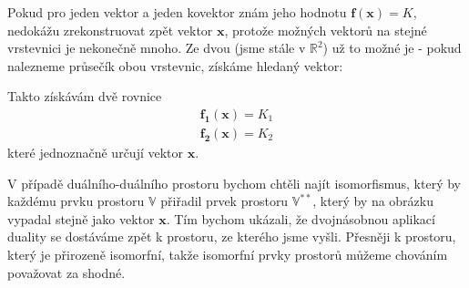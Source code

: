 \documentclass[a5paper,12pt]{amsbook}
\theoremstyle{definition}
\newcommand{\myvec}[1]{\bm{#1}}
\newcommand{\myspace}[1]{\mathbb{#1}}
\newcommand{\mydouble}[1]{\myspace{#1^{**}}}
\begin{document}
Pokud pro jeden vektor a jeden kovektor znám jeho hodnotu $\myvec{f(\myvec{x})} = K$, nedokážu zrekonstruovat
zpět vektor $\myvec{x}$, protože možných vektorů na stejné vrstevnici je nekonečně mnoho. Ze dvou (jsme stále
v $\mathbb{R}^2$) už to možné je - pokud nalezneme průsečík obou vrstevnic, získáme hledaný vektor:

\begin{center}

\end{center}

\noindent Takto získávám dvě rovnice
\begin{equation*}
\begin{split}
\myvec{f_1}(\myvec{x}) = K_1 \\
\myvec{f_2}(\myvec{x}) = K_2
\end{split}
\end{equation*}
které jednoznačně určují vektor $\myvec{x}$.

V případě duálního-duálního prostoru bychom chtěli najít isomorfismus, který by každému prvku prostoru
$\myspace{V}$ přiřadil prvek prostoru $\mydouble{V}$, který by na obrázku vypadal stejně jako vektor
$\myvec{x}$. Tím bychom ukázali, že dvojnásobnou aplikací duality se dostáváme zpět k prostoru,
ze kterého jsme vyšli. Přesněji k prostoru, který je přirozeně isomorfní, takže isomorfní prvky prostorů
můžeme chováním považovat za shodné.
\end{document}
